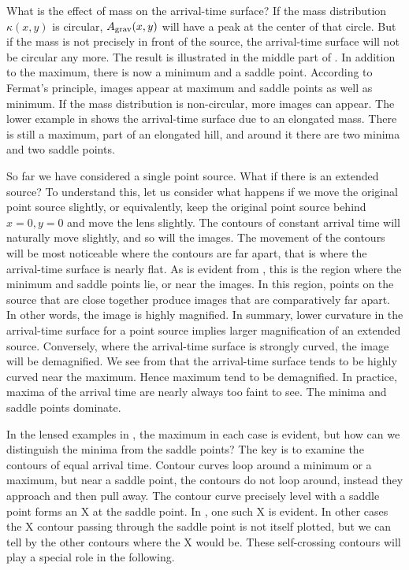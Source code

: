 What is the effect of mass on the arrival-time surface?  If the mass
distribution $\kappa(x,y)$ is circular, $A_{\rm grav}(x,y)$ will have
a peak at the center of that circle.  But if the mass is not precisely
in front of the source, the arrival-time surface will not be circular
any more.  The result is illustrated in the middle part of
.  In addition to the maximum, there is now a
minimum and a saddle point.  According to Fermat's principle, images
appear at maximum and saddle points as well as minimum.  If the mass
distribution is non-circular, more images can appear.  The lower
example in  shows the arrival-time surface due
to an elongated mass.  There is still a maximum, part of an elongated
hill, and around it there are two minima and two saddle points.

So far we have considered a single point source.  What if there is an
extended source?  To understand this, let us consider what happens if
we move the original point source slightly, or equivalently, keep the
original point source behind $x=0,y=0$ and move the lens slightly.
The contours of constant arrival time will naturally move slightly,
and so will the images.  The movement of the contours will be most
noticeable where the contours are far apart, that is where the
arrival-time surface is nearly flat.  As is evident from
, this is the region where the minimum and saddle
points lie, or near the images.  In this region, points on the source
that are close together produce images that are comparatively far
apart.  In other words, the image is highly magnified.  In summary,
lower curvature in the arrival-time surface for a point source implies
larger magnification of an extended source.  Conversely, where the
arrival-time surface is strongly curved, the image will be
demagnified.  We see from  that the arrival-time
surface tends to be highly curved near the maximum.  Hence maximum tend
to be demagnified.  In practice, maxima of the arrival time are nearly
always too faint to see. The minima and saddle points dominate.

In the lensed examples in , the maximum in each
case is evident, but how can we distinguish the minima from the saddle
points?  The key is to examine the contours of equal arrival time.
Contour curves loop around a minimum or a maximum, but near a saddle
point, the contours do not loop around, instead they approach and then
pull away.  The contour curve precisely level with a saddle point
forms an X at the saddle point.  In , one such X
is evident.  In other cases the X contour passing through the saddle
point is not itself plotted, but we can tell by the other contours where
the X would be.  These self-crossing contours will play a special role
in the following.

